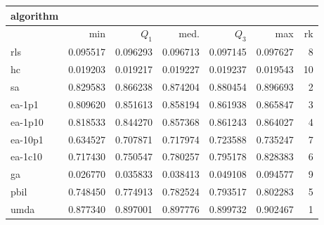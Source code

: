 \begin{tabular}{@{}l*{5}{>{{}}N{1}{3}}>{{}}N{2}{0}@{}}
\toprule
{algorithm} &  \\
\midrule
& {min} & {$Q_1$} & {med.} & {$Q_3$} & {max} & {rk}\\
\midrule
rls & 0.095517 & 0.096293 & 0.096713 & 0.097145 & 0.097627 & 8\\
hc & 0.019203 & 0.019217 & 0.019227 & 0.019237 & 0.019543 & 10\\
sa & 0.829583 & 0.866238 & 0.874204 & 0.880454 & 0.896693 & 2\\
ea-1p1 & 0.809620 & 0.851613 & 0.858194 & 0.861938 & 0.865847 & 3\\
ea-1p10 & 0.818533 & 0.844270 & 0.857368 & 0.861243 & 0.864027 & 4\\
ea-10p1 & 0.634527 & 0.707871 & 0.717974 & 0.723588 & 0.735247 & 7\\
ea-1c10 & 0.717430 & 0.750547 & 0.780257 & 0.795178 & 0.828383 & 6\\
ga & 0.026770 & 0.035833 & 0.038413 & 0.049108 & 0.094577 & 9\\
pbil & 0.748450 & 0.774913 & 0.782524 & 0.793517 & 0.802283 & 5\\
umda & {\color{blue}} 0.877340 & {\color{blue}} 0.897001 & {\color{blue}} 0.897776 & {\color{blue}} 0.899732 & {\color{blue}} 0.902467 & 1\\
\bottomrule
\end{tabular}
